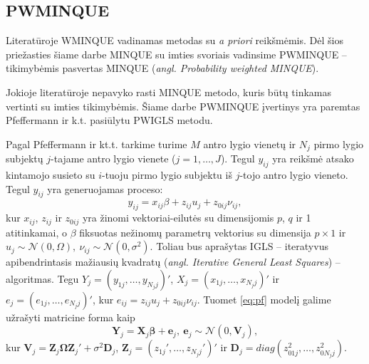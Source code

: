 \documentclass[11pt,a4paper]{article}
\begin{document}
\subsection{PWMINQUE}
\indent Literatūroje WMINQUE vadinamas metodas su \textit{a priori} reikšmėmis. Dėl šios priežasties šiame darbe MINQUE su imties svoriais vadinsime PWMINQUE -- tikimybėmis pasvertas MINQUE (\textit{angl. Probability weighted MINQUE}).

\indent Jokioje literatūroje nepavyko rasti MINQUE metodo, kuris būtų tinkamas vertinti su imties tikimybėmis. Šiame darbe PWMINQUE įvertinys yra paremtas Pfeffermann ir k.t.\cite{pfeff} pasiūlytu PWIGLS metodu.

\indent Pagal Pfeffermann ir kt.t. tarkime turime $M$ antro lygio vienetų ir $N_j$ pirmo lygio subjektų $j$-tajame antro lygio vienete ($j=1,\dots,J$). Tegul $y_{ij}$ yra reikšmė atsako kintamojo susieto su $i$-tuoju pirmo lygio subjektu iš $j$-tojo antro lygio vieneto. Tegul $y_{ij}$ yra generuojamas proceso:
\begin{equation*}\label{eq:pf}
y_{ij}=x_{ij}\beta+z_{ij}u_j+z_{0ij}\nu_{ij},
\end{equation*} 
kur $x_{ij}$, $z_{ij}$ ir $z_{0ij}$ yra žinomi vektoriai-eilutės su dimensijomis $p$, $q$ ir 1 atitinkamai, o $\beta$ fiksuotas nežinomų parametrų vektorius su dimensija $p\times1$ ir $u_j\sim \mathcal{N}(0, \Omega),\ \nu_{ij}\sim \mathcal{N}(0, \sigma^2)$. Toliau bus aprašytas IGLS -- iteratyvus apibendrintasis mažiausių kvadratų (\textit{angl. Iterative General Least Squares}) -- algoritmas. Tegu $Y_j = (y_{1j},\dots,y_{N_jj})'$, $X_j=(x_{1j},\dots,x_{N_jj})'$ ir $e_j=(e_{1j},\dots,e_{N_jj})'$, kur $e_{ij}=z_{ij}u_j+z_{0ij}\nu_{ij}$. Tuomet \ref{eq:pf} modelį galime užrašyti matricine forma kaip
\begin{equation*}
\mathbf{Y}_j=\mathbf{X}_j\boldsymbol{\beta}+\mathbf{e}_j, \ \mathbf{e}_j\sim \mathcal{N}(0, \mathbf{V}_j),
\end{equation*}
kur $\mathbf{V}_j=\mathbf{Z}_j\boldsymbol{\Omega} \mathbf{Z}_j'+\sigma^2\mathbf{D}_j$, $\mathbf{Z}_j=(z_{1j}',\dots,z_{N_jj}')'$ ir $\mathbf{D}_j=diag(z_{01j}^2,\dots,z_{0N_jj}^2)$.
\end{document}
